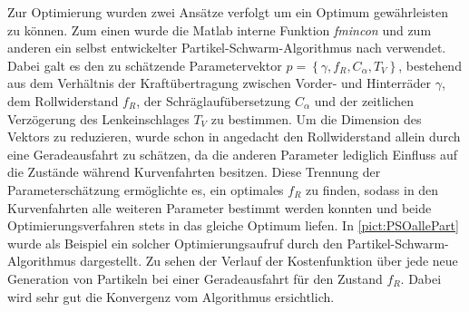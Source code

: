 Zur Optimierung wurden zwei Ansätze verfolgt um ein Optimum gewährleisten zu können. Zum einen wurde die Matlab interne Funktion \textit{fmincon} und zum anderen ein selbst entwickelter Partikel-Schwarm-Algorithmus nach \cite{PSO} verwendet. Dabei galt es den zu schätzende Parametervektor $p=\left \{ \gamma, f_R, C_{\alpha}, T_V\right \}$, bestehend aus dem Verhältnis der Kraftübertragung zwischen Vorder- und Hinterräder $\gamma$, dem Rollwiderstand $f_R$, der Schräglaufübersetzung $C_{\alpha}$ und der zeitlichen Verzögerung des Lenkeinschlages $T_V$ zu bestimmen. Um die Dimension des Vektors zu reduzieren, wurde schon in \cite{VikAnd} angedacht den Rollwiderstand allein durch eine Geradeausfahrt zu schätzen, da die anderen Parameter lediglich Einfluss auf die Zustände während Kurvenfahrten besitzen. Diese Trennung der Parameterschätzung ermöglichte es, ein optimales $f_R$ zu finden, sodass in den Kurvenfahrten alle weiteren Parameter bestimmt werden konnten und beide Optimierungsverfahren stets in das gleiche Optimum liefen. In \ref{pict:PSOallePart} wurde als Beispiel ein solcher Optimierungsaufruf durch den Partikel-Schwarm-Algorithmus dargestellt. Zu sehen der Verlauf der Kostenfunktion über jede neue Generation von Partikeln bei einer Geradeausfahrt für den Zustand $f_R$. Dabei wird sehr gut die Konvergenz vom Algorithmus ersichtlich.
